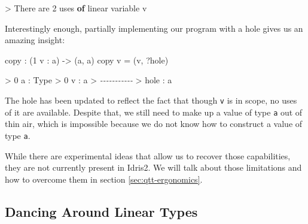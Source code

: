 \documentclass[
]{article}
\newenvironment{Shaded}{}{}
\newcommand{\CommentTok}[1]{\textcolor[rgb]{0.38,0.63,0.69}{\textit{#1}}}
\newcommand{\DataTypeTok}[1]{\textcolor[rgb]{0.56,0.13,0.00}{#1}}
\newcommand{\DecValTok}[1]{\textcolor[rgb]{0.25,0.63,0.44}{#1}}
\newcommand{\KeywordTok}[1]{\textcolor[rgb]{0.00,0.44,0.13}{\textbf{#1}}}
\newcommand{\NormalTok}[1]{#1}
\newcommand{\OperatorTok}[1]{\textcolor[rgb]{0.40,0.40,0.40}{#1}}
\newcommand{\OtherTok}[1]{\textcolor[rgb]{0.00,0.44,0.13}{#1}}
\begin{document}
\begin{Shaded}
\begin{Highlighting}[]
\OperatorTok{\textgreater{}} \DataTypeTok{There}\NormalTok{ are }\DecValTok{2}\NormalTok{ uses }\KeywordTok{of}\NormalTok{ linear variable v}
\end{Highlighting}
\end{Shaded}

Interestingly enough, partially implementing our program with a hole
gives us an amazing insight:

\begin{Shaded}
\begin{Highlighting}[]
\NormalTok{copy }\OperatorTok{:}\NormalTok{ (}\DecValTok{1}\NormalTok{ v }\OperatorTok{:}\NormalTok{ a) }\OtherTok{{-}\textgreater{}}\NormalTok{ (a, a)}
\NormalTok{copy v }\OtherTok{=}\NormalTok{ (v, }\OperatorTok{?}\NormalTok{hole)}
\end{Highlighting}
\end{Shaded}

\begin{Shaded}
\begin{Highlighting}[]
\OperatorTok{\textgreater{}} \DecValTok{0}\NormalTok{ a }\OperatorTok{:} \DataTypeTok{Type}
\OperatorTok{\textgreater{}} \DecValTok{0}\NormalTok{ v }\OperatorTok{:}\NormalTok{ a}
\OperatorTok{\textgreater{}} \CommentTok{{-}{-}{-}{-}{-}{-}{-}{-}{-}{-}{-}}
\OperatorTok{\textgreater{}}\NormalTok{ hole }\OperatorTok{:}\NormalTok{ a}
\end{Highlighting}
\end{Shaded}

The hole has been updated to reflect the fact that though \texttt{v} is
in scope, no uses of it are available. Despite that, we still need to
make up a value of type \texttt{a} out of thin air, which is impossible
because we do not know how to construct a value of type \texttt{a}.

While there are experimental ideas that allow us to recover those
capabilities, they are not currently present in Idris2. We will talk
about those limitations and how to overcome them in section
\ref{sec:qtt-ergonomics}.

\hypertarget{dancing-around-linear-types}{%
\subsection{Dancing Around Linear
Types}\label{dancing-around-linear-types}}

\label{subsec:dancing-around}
\end{document}
